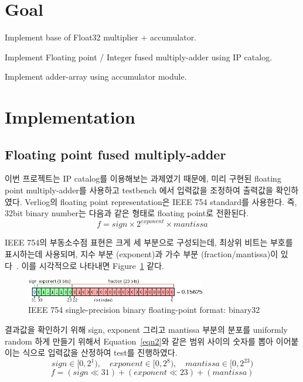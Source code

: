 \documentclass{article}
\begin{document}
\pagestyle{fancy}

\section*{Goal}

\begin{itemize*}
\item Implement base of Float32 multiplier + accumulator.
\item Implement Floating point / Integer fused multiply-adder using IP catalog.
\item Implement adder-array using accumulator module.
\end{itemize*}

\section{Implementation}

\subsection{Floating point fused multiply-adder}

이번 프로젝트는 IP catalog를 이용해보는 과제였기 때문에, 미리 구현된 floating point multiply-adder를 사용하고
testbench 에서 입력값을 조정하여 출력값을 확인하였다.
Verliog의 floating point representation은 IEEE 754 standard를 사용한다. 
즉, 32bit binary number는 다음과 같은 형태로 floating point로 전환된다. 
\begin{equation}
	 f = sign \times 2^{exponent} \times mantissa
\label{eqn1}
\end{equation}

IEEE 754의 부동소수점 표현은 크게 세 부분으로 구성되는데, 최상위 비트는 부호를 표시하는데 사용되며, 지수 부분 (exponent)과 가수 부분 (fraction/mantissa)이 있다~\cite{overton2001numerical}.
이를 시각적으로 나타내면 Figure~\ref{fig1} 같다.

\begin{figure}[ht]
	\centering
	\includegraphics[width=0.7\textwidth]{fig/fig1.png}
	\caption{IEEE 754 single-precision binary floating-point format: binary32}
\label{fig1}
\end{figure}

결과값을 확인하기 위해 sign, exponent 그리고 mantissa 부분의 분포를 uniformly random 하게 만들기 위해서 Equation~\ref{eqn2}와 같은 범위 사이의 숫자를 뽑아 이어붙이는 식으로 입력값을 산정하여 test를 진행하였다.
\begin{equation}
	 sign \in [0, 2^1), \quad exponent \in [0, 2^8), \quad mantissa \in [0, 2^{23})
\label{eqn2}
\end{equation}
\begin{equation}
	 f = (sign \ll 31) + (exponent  \ll 23) + (mantissa)
\label{eqn3}
\end{equation}
\end{document}
